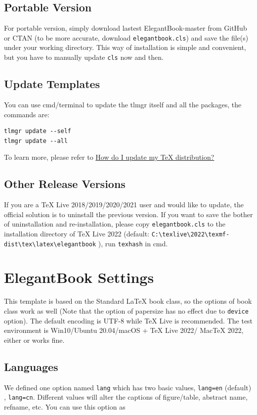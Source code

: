 \documentclass[11pt]{elegantbook}
\begin{document}
\section{Portable Version}
For portable version, simply download lastest ElegantBook-master from GitHub or CTAN (to be more accurate, download \lstinline{elegantbook.cls}) and save the file(s) under your working directory. This way of installation is simple and convenient, but you have to manually update \lstinline{cls} now and then.


\section{Update Templates}
You can use cmd/terminal to update the tlmgr itself and all the packages, the commands are:
\begin{lstlisting}
tlmgr update --self
tlmgr update --all
\end{lstlisting}

To learn more, please refer to \href{https://tex.stackexchange.com/questions/55437/how-do-i-update-my-tex-distribution}{How do I update my \TeX{} distribution?}

\section{Other Release Versions}
If you are a \TeX{} Live 2018/2019/2020/2021 user and would like to update, the official solution is to uninstall the previous version. If you want to save the bother of uninstallation and re-installation, please copy \lstinline{elegantbook.cls} to the installation directory of \TeX{} Live 2022 (default: \lstinline|C:\texlive\2022\texmf-dist\tex\latex\elegantbook| ), run \lstinline{texhash} in cmd.

\chapter{ElegantBook Settings}
This template is based on the Standard \LaTeX{} book class, so the options of book class work as well (Note that the option of papersize has no effect due to \lstinline{device} option). The default encoding is UTF-8 while \TeX{} Live is recommended. The test environment is Win10/Ubuntu 20.04/macOS + \TeX{} Live 2022/ Mac\TeX{} 2022, either  or  works fine.

\section{Languages}
We defined one option named \lstinline{lang} which has two basic values, \lstinline{lang=en} (default) , \lstinline{lang=cn}. Different values will alter the captions of figure/table, abstract name, refname, etc. You can use this option as
\end{document}
